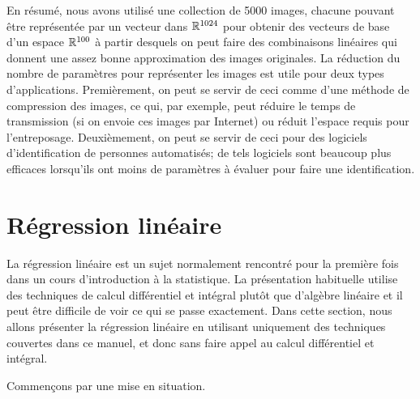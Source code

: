 \begin{adjmulticols}{1}{0in}{-2in}
\begin{center}
\begin{minipage}{0.45\textwidth}
\end{minipage}
\end{center}

\end{adjmulticols}

En résumé, nous avons utilisé une collection de 5000 images, chacune pouvant être représentée par
un vecteur dans $\mathbb{R}^{1024}$ pour obtenir des vecteurs de base d'un espace $\mathbb{R}^{100}$ à partir
desquels on peut faire des combinaisons linéaires qui donnent une assez bonne approximation des images
originales.  La réduction du nombre de paramètres pour représenter les images est utile
pour deux types d'applications.  Premièrement, on peut se servir de ceci comme d'une méthode de compression
des images, ce qui, par exemple, peut réduire le temps de transmission (si on envoie ces images par Internet)
ou réduit l'espace requis pour l'entreposage.  Deuxièmement, on peut se servir de ceci pour des logiciels
d'identification de personnes automatisés; de tels logiciels sont beaucoup plus efficaces lorsqu'ils ont moins de paramètres
à évaluer pour faire une identification.


\section{Régression linéaire}

La régression linéaire
est un sujet normalement rencontré pour la première fois dans un cours
d'introduction à la statistique.  La présentation habituelle utilise des techniques de calcul
différentiel et intégral plutôt que d'algèbre linéaire et il peut être difficile de voir
ce qui se passe exactement.  Dans cette section, nous allons présenter la régression linéaire
en utilisant uniquement des techniques couvertes dans ce manuel, et donc sans faire appel
au calcul différentiel et intégral.  

Commençons par une mise en situation.

